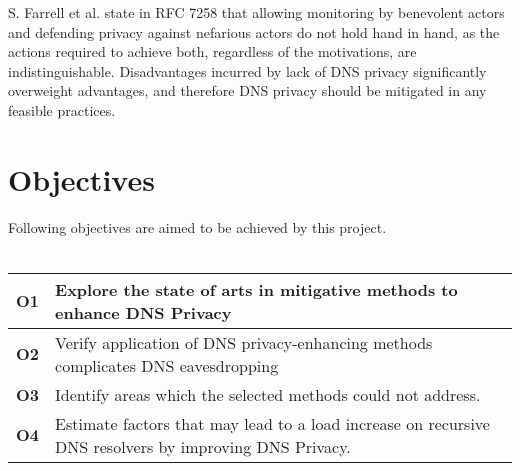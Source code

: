 \documentclass[a4paper,12pt]{article}
\begin{document}
S. Farrell et al. state in RFC 7258 that allowing monitoring by benevolent actors and defending privacy against nefarious actors do not hold hand in hand, as the actions required to achieve both, regardless of the motivations, are indistinguishable\cite{rfc7258}.
Disadvantages incurred by lack of DNS privacy significantly overweight advantages, and therefore DNS privacy should be mitigated in any feasible practices.

\section*{Objectives}


Following objectives are aimed to be achieved by this project.
\\\\
\begin{tabular} {|p{1.2cm}|p{12.9cm}|} \hline
\textbf{O1} & Explore the state of arts in mitigative methods to enhance DNS Privacy \\ \hline
\textbf{O2} & Verify application of DNS privacy-enhancing methods complicates DNS eavesdropping\\ \hline
\textbf{O3} & Identify areas which the selected methods could not address. \\ \hline
\textbf{O4} & Estimate factors that may lead to a load increase on recursive DNS resolvers by improving DNS Privacy.\\ \hline
\end{tabular}
\end{document}
